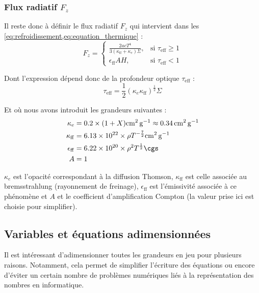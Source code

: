 \subsubsection{\texorpdfstring{Flux radiatif $F_z$}{Flux radiatif Fz}}

Il reste donc à définir le flux radiatif $F_z$ qui intervient dans les
\cref{eq:refroidissement,eq:equation_thermique} :
\begin{equation}
    \label{eq:flux}
    F_z =
    \begin{cases}
        \frac{2 a c T^4}{3 (\kappa_\mathrm{ff} + \kappa_e)\Sigma}, &\text{si $\tau_\mathrm{eff} \geq 1$} \\
        \epsilon_\mathrm{ff} A H, &\text{si $\tau_\mathrm{eff} < 1$}
    \end{cases}
\end{equation}

Dont l’expression dépend donc de la profondeur optique $\tau_\mathrm{eff}$ :
\begin{equation}
    \label{eq:tau_eff}
    \tau_\mathrm{eff} = \frac{1}{2} (\kappa_e \kappa_\mathrm{ff})^\frac{1}{2} \Sigma
\end{equation}

Et où nous avons introduit les grandeurs suivantes :
\begin{align}
    \label{eq:opacite_thomson}
    \kappa_e &= 0.2 \times (1 + X) \si{\square\centi\meter\per\gram} \approx \SI{0.34}{\square\centi\meter\per\gram} \\
    \label{eq:opacite_bremsstrahlung}
    \kappa_\mathrm{ff} &= \num{6.13e22} \times \rho T^{-\frac{7}{2}} \si{\square\centi\meter\per\gram}\\
    \label{eq:emissivite}
    \epsilon_\mathrm{ff} &= \num{6.22e20} \times \rho^2 T^\frac{1}{2} \si{\cgs} \\
    A &= 1
\end{align}

$\kappa_e$ est l’opacité correspondant à la diffusion Thomson,
$\kappa_\mathrm{ff}$ est celle associée au bremsstrahlung (rayonnement de
freinage), $\epsilon_\mathrm{ff}$ est l’émissivité associée à ce phénomène et
$A$ et le coefficient d’amplification Compton (la valeur prise ici est choisie
pour simplifier).

\subsection{Variables et équations adimensionnées}

Il est intéressant d’adimensionner toutes les grandeurs en jeu pour plusieurs
raisons. Notamment, cela permet de simplifier l’écriture des équations ou
encore d’éviter un certain nombre de problèmes numériques liés à la
représentation des nombres en informatique.

